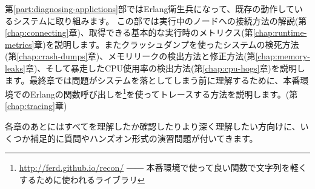 第\ref{part:diagnosing-applictions}部ではErlang衛生兵になって、既存の動作しているシステムに取り組みます。
この部では実行中のノードへの接続方法の解説(第\ref{chap:connecting}章)、取得できる基本的な実行時のメトリクス(第\ref{chap:runtime-metrics}章)を説明します。またクラッシュダンプを使ったシステムの検死方法(第\ref{chap:crash-dumps}章)、メモリリークの検出方法と修正方法(第\ref{chap:memory-leaks}章)、そして暴走したCPU使用率の検出方法(第\ref{chap:cpu-hogs}章)を説明します。最終章では問題がシステムを落としてしまう前に理解するために、本番環境でのErlangの関数呼び出しを\footnote{\href{http://ferd.github.io/recon/}{http://ferd.github.io/recon/} ―― 本番環境で使って良い関数で文字列を軽くするために使われるライブラリ}を使ってトレースする方法を説明します。(第\ref{chap:tracing}章)

各章のあとにはすべてを理解したか確認したりより深く理解したい方向けに、いくつか補足的に質問やハンズオン形式の演習問題が付いてきます。

